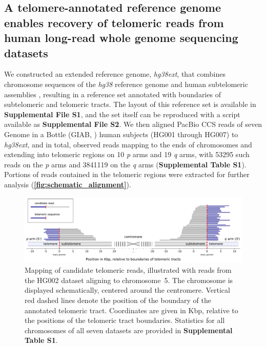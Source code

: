 \documentclass{article}
\begin{document}
\subsection*{A telomere-annotated reference genome enables recovery of telomeric reads from human long-read whole genome sequencing datasets}
    We constructed an extended reference genome, \textit{hg38ext},
        that combines chromosome sequences of the \textit{hg38} reference genome \parencite{grch38,hg38}
            and human subtelomeric assemblies \parencite{riethman2014},
        resulting in a reference set annotated with boundaries of subtelomeric and telomeric tracts.
        The layout of this reference set is available in \textbf{Supplemental File S1},
            and the set itself can be reproduced with a script available as \textbf{Supplemental File S2}.
    We then aligned PacBio CCS reads of seven Genome in a Bottle (GIAB, \parencite{giab}) human subjects (HG001 through HG007) to \textit{hg38ext},
        and in total, observed reads mapping to the ends of chromosomes and extending into telomeric regions
            on 10 \textit{p} arms and 19 \textit{q} arms,
                with 53\textendash{}295 such reads on the \textit{p} arms
                and 384\textendash{}1119 on the \textit{q} arms
                    (\textbf{Supplemental Table S1}).
    Portions of reads contained in the telomeric regions were extracted for further analysis (\textbf{\autoref{fig:schematic_alignment}}).
        \begin{figure}[h!] \centering %
        \includegraphics[height=.75\textheight,width=\textwidth,keepaspectratio]{../figures/Figure_1.pdf}
        \caption{
             \small Mapping of candidate telomeric reads, illustrated with reads from the HG002 dataset aligning to \mbox{chromosome 5.}
             The chromosome is displayed schematically, centered around the centromere.
             Vertical red dashed lines denote the position of the boundary of the annotated telomeric tract.
             Coordinates are given in Kbp, relative to the positions of the telomeric tract boundaries.
             Statistics for all chromosomes of all seven datasets are provided in \textbf{Supplemental Table S1}.
        }
        \label{fig:schematic_alignment}
        \end{figure}
\end{document}
